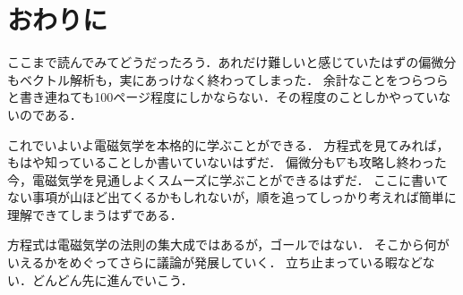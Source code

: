 \chapter{おわりに}
ここまで読んでみてどうだったろう．あれだけ難しいと感じていたはずの偏微分もベクトル解析も，実にあっけなく終わってしまった．
余計なことをつらつらと書き連ねても100ページ程度にしかならない．その程度のことしかやっていないのである．

これでいよいよ電磁気学を本格的に学ぶことができる．
方程式を見てみれば，もはや知っていることしか書いていないはずだ．
偏微分も$\nabla$も攻略し終わった今，電磁気学を見通しよくスムーズに学ぶことができるはずだ．
ここに書いてない事項が山ほど出てくるかもしれないが，順を追ってしっかり考えれば簡単に理解できてしまうはずである．

方程式は電磁気学の法則の集大成ではあるが，ゴールではない．
そこから何がいえるかをめぐってさらに議論が発展していく．
立ち止まっている暇などない．どんどん先に進んでいこう．
